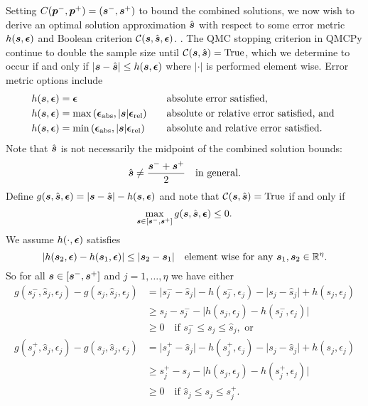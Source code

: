 \documentclass{article}
\newcommand{\bepsabs}{\boldsymbol{\epsilon}_\text{abs}}
\newcommand{\bepsrel}{\boldsymbol{\epsilon}_\text{rel}}
\newcommand{\bepsabs}{\epsilon_\text{abs}}
\newcommand{\bepsabs}{\epsilon_\text{rel}}
\begin{document}
Setting $C(\boldsymbol{p}^-,\boldsymbol{p}^+) = (\boldsymbol{s}^-,\boldsymbol{s}^+)$ to bound the combined solutions, we now wish to derive an optimal solution approximation $\hat{\boldsymbol{s}}$ with respect to some error metric $h(\boldsymbol{s},\boldsymbol{\epsilon})$ and Boolean criterion $\mathcal{C}(\boldsymbol{s},\hat{\boldsymbol{s}},\boldsymbol{\epsilon})$.  . The QMC stopping criterion in QMCPy continue to double the sample size until $\mathcal{C}(\boldsymbol{s},\hat{\boldsymbol{s}})=\text{True}$, which we determine to occur if and only if $\lvert \boldsymbol{s} - \hat{\boldsymbol{s}} \rvert \leq h(\boldsymbol{s},\boldsymbol{\epsilon})$ where $\lvert \cdot \rvert$ is performed element wise. Error metric options include
\begin{align}
    h(\bs,\bepsilon) & = \bepsilon \quad &&\text{absolute error satisfied}, \\
    h(\bs,\bepsilon) &= \max\left(\bepsabs,\lvert \bs \rvert \bepsrel \right) \quad &&\text{absolute or relative error satisfied, and } \label{eq:h_abs_or_rel} \\
    h(\bs,\bepsilon) &= \min\left(\bepsabs,\lvert \bs \rvert \bepsrel \right) \quad &&\text{absolute and relative error satisfied.} \label{eq:h_abs_and_rel}
\end{align}
Note that $\hat{\boldsymbol{s}}$ is not necessarily the midpoint of the combined solution bounds:
\begin{equation}
    \hat{\boldsymbol{s}} \neq \frac{\boldsymbol{s}^-+\boldsymbol{s}^+}{2} \quad \text{in general.}
\end{equation}
Define $g(\boldsymbol{s},\hat{\boldsymbol{s}},\boldsymbol{\epsilon})=\lvert \boldsymbol{s} - \hat{\boldsymbol{s}}\rvert -h(\boldsymbol{s},\boldsymbol{\epsilon})$ and note that $\mathcal{C}(\boldsymbol{s},\hat{\boldsymbol{s}})=\text{True}$ if and only if 
\begin{equation}
    \max_{\boldsymbol{s} \in [\boldsymbol{s}^-,\boldsymbol{s}^+]} g(\boldsymbol{s},\hat{\boldsymbol{s}},\boldsymbol{\epsilon}) \leq 0.
\end{equation}
We assume $h(\cdot,\boldsymbol{\epsilon})$ satisfies 
\begin{equation}
    \lvert h(\boldsymbol{s}_2,\boldsymbol{\epsilon}) - h(\boldsymbol{s}_1,\boldsymbol{\epsilon}) \rvert \leq \lvert \boldsymbol{s}_2 - \boldsymbol{s}_1 \rvert \quad \text{element wise for any } \boldsymbol{s}_1,\boldsymbol{s}_2 \in \mathbb{R}^\eta.
\end{equation}
So for all $\boldsymbol{s} \in [\boldsymbol{s}^-,\boldsymbol{s}^+]$ and $j=1,\dots,\eta$ we have either
\begin{align}
    g(s_j^-,\hat{s}_j,\epsilon_j)-g(s_j,\hat{s}_j,\epsilon_j) 
    &= \lvert s_j^- - \hat{s}_j \rvert -h(s_j^-,\epsilon_j) - \lvert s_j - \hat{s}_j \rvert  + h(s_j,\epsilon_j) \\
    &\geq s_j - s_j^- - \lvert h(s_j,\epsilon_j)-h(s_j^-,\epsilon_j) \rvert \\
    &\geq 0 \quad \text{if } s_j^- \leq s_j \leq \hat{s}_j, \text{ or} \\
    g(s_j^+,\hat{s}_j,\epsilon_j)-g(s_j,\hat{s}_j,\epsilon_j) 
    &= \lvert s_j^+ - \hat{s}_j \rvert -h(s_j^+,\epsilon_j) - \lvert s_j - \hat{s}_j \rvert  + h(s_j,\epsilon_j) \\
    &\geq s_j^+ - s_j - \lvert h(s_j,\epsilon_j)-h(s_j^+,\epsilon_j) \rvert \\
    &\geq 0 \quad \text{if } \hat{s}_j \leq s_j \leq s_j^+.
\end{align}
\end{document}
